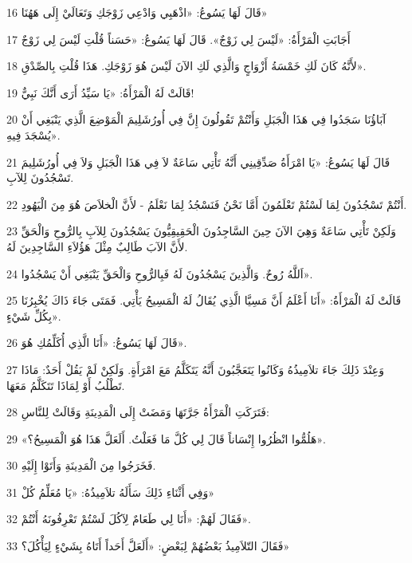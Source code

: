 \par 16 قَالَ لَهَا يَسُوعُ: «اذْهَبِي وَادْعِي زَوْجَكِ وَتَعَالَيْ إِلَى هَهُنَا»
\par 17 أَجَابَتِ الْمَرْأَةُ: «لَيْسَ لِي زَوْجٌ». قَالَ لَهَا يَسُوعُ: «حَسَناً قُلْتِ لَيْسَ لِي زَوْجٌ
\par 18 لأَنَّهُ كَانَ لَكِ خَمْسَةُ أَزْوَاجٍ وَالَّذِي لَكِ الآنَ لَيْسَ هُوَ زَوْجَكِ. هَذَا قُلْتِ بِالصِّدْقِ».
\par 19 قَالَتْ لَهُ الْمَرْأَةُ: «يَا سَيِّدُ أَرَى أَنَّكَ نَبِيٌّ!
\par 20 آبَاؤُنَا سَجَدُوا فِي هَذَا الْجَبَلِ وَأَنْتُمْ تَقُولُونَ إِنَّ فِي أُورُشَلِيمَ الْمَوْضِعَ الَّذِي يَنْبَغِي أَنْ يُسْجَدَ فِيهِ».
\par 21 قَالَ لَهَا يَسُوعُ: «يَا امْرَأَةُ صَدِّقِينِي أَنَّهُ تَأْتِي سَاعَةٌ لاَ فِي هَذَا الْجَبَلِ وَلاَ فِي أُورُشَلِيمَ تَسْجُدُونَ لِلآبِ.
\par 22 أَنْتُمْ تَسْجُدُونَ لِمَا لَسْتُمْ تَعْلَمُونَ أَمَّا نَحْنُ فَنَسْجُدُ لِمَا نَعْلَمُ - لأَنَّ الْخلاَصَ هُوَ مِنَ الْيَهُودِ.
\par 23 وَلَكِنْ تَأْتِي سَاعَةٌ وَهِيَ الآنَ حِينَ السَّاجِدُونَ الْحَقِيقِيُّونَ يَسْجُدُونَ لِلآبِ بِالرُّوحِ وَالْحَقِّ لأَنَّ الآبَ طَالِبٌ مِثْلَ هَؤُلاَءِ السَّاجِدِينَ لَهُ.
\par 24 اَللَّهُ رُوحٌ. وَالَّذِينَ يَسْجُدُونَ لَهُ فَبِالرُّوحِ وَالْحَقِّ يَنْبَغِي أَنْ يَسْجُدُوا».
\par 25 قَالَتْ لَهُ الْمَرْأَةُ: «أَنَا أَعْلَمُ أَنَّ مَسِيَّا الَّذِي يُقَالُ لَهُ الْمَسِيحُ يَأْتِي. فَمَتَى جَاءَ ذَاكَ يُخْبِرُنَا بِكُلِّ شَيْءٍ».
\par 26 قَالَ لَهَا يَسُوعُ: «أَنَا الَّذِي أُكَلِّمُكِ هُوَ».
\par 27 وَعِنْدَ ذَلِكَ جَاءَ تلاَمِيذُهُ وَكَانُوا يَتَعَجَّبُونَ أَنَّهُ يَتَكَلَّمُ مَعَ امْرَأَةٍ. وَلَكِنْ لَمْ يَقُلْ أَحَدٌ: مَاذَا تَطْلُبُ أَوْ لِمَاذَا تَتَكَلَّمُ مَعَهَا.
\par 28 فَتَرَكَتِ الْمَرْأَةُ جَرَّتَهَا وَمَضَتْ إِلَى الْمَدِينَةِ وَقَالَتْ لِلنَّاسِ:
\par 29 «هَلُمُّوا انْظُرُوا إِنْسَاناً قَالَ لِي كُلَّ مَا فَعَلْتُ. أَلَعَلَّ هَذَا هُوَ الْمَسِيحُ؟».
\par 30 فَخَرَجُوا مِنَ الْمَدِينَةِ وَأَتَوْا إِلَيْهِ.
\par 31 وَفِي أَثْنَاءِ ذَلِكَ سَأَلَهُ تلاَمِيذُهُ: «يَا مُعَلِّمُ كُلْ»
\par 32 فَقَالَ لَهُمْ: «أَنَا لِي طَعَامٌ لِآكُلَ لَسْتُمْ تَعْرِفُونَهُ أَنْتُمْ».
\par 33 فَقَالَ التّلاَمِيذُ بَعْضُهُمْ لِبَعْضٍ: «أَلَعَلَّ أَحَداً أَتَاهُ بِشَيْءٍ لِيَأْكُلَ؟»
